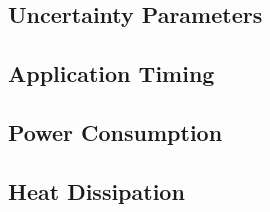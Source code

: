 \subsection{Uncertainty Parameters} 


\subsection{Application Timing}


\subsection{Power Consumption}


\subsection{Heat Dissipation}

